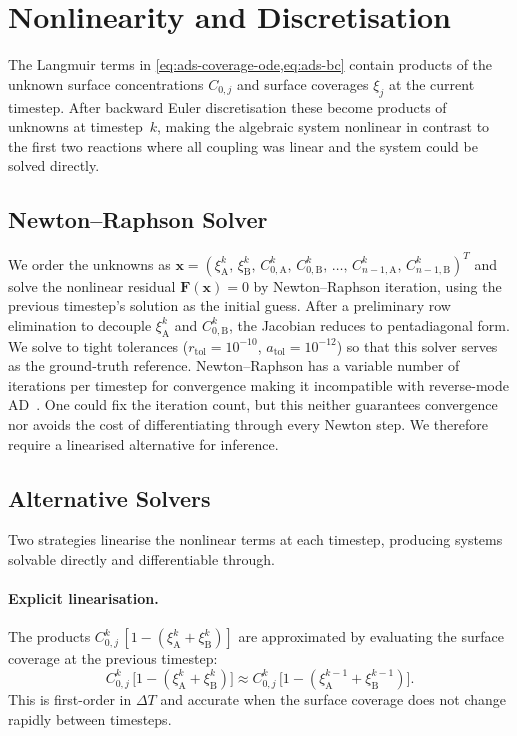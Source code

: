 \section{Nonlinearity and Discretisation}\label{sec:ads-disc}

The Langmuir terms in \cref{eq:ads-coverage-ode,eq:ads-bc} contain
products of the unknown surface concentrations $C_{0,j}$ and surface
coverages $\xi_j$ at the current timestep. After backward Euler
discretisation these become products of unknowns at timestep~$k$,
making the algebraic system nonlinear in contrast to
the first two reactions where all coupling was linear and the system
could be solved directly.

\subsection{Newton--Raphson Solver}\label{sec:ads-newton}

We order the unknowns as $\mathbf{x} = (\xi_\mathrm{A}^k,\,
  \xi_\mathrm{B}^k,\, C_{0,\mathrm{A}}^k,\, C_{0,\mathrm{B}}^k,\,
\ldots,\, C_{n-1,\mathrm{A}}^k,\, C_{n-1,\mathrm{B}}^k)^T$ and solve
the nonlinear residual $\mathbf{F}(\mathbf{x}) = 0$ by Newton--Raphson
iteration, using the previous timestep's solution as the initial guess.
After a preliminary row elimination to decouple $\xi_\mathrm{A}^k$
and $C_{0,\mathrm{B}}^k$, the Jacobian reduces to pentadiagonal form.
We solve to tight tolerances ($r_{\mathrm{tol}} = 10^{-10}$,
$a_{\mathrm{tol}} = 10^{-12}$) so that this solver serves as the
ground-truth reference. Newton--Raphson has a variable number of
iterations per timestep for convergence making it incompatible with reverse-mode
AD~\cite{jax2018github}. One could fix the iteration count, but this
neither guarantees convergence nor avoids the cost of differentiating
through every Newton step. We therefore require a linearised
alternative for inference.
\subsection{Alternative Solvers}\label{sec:ads-alt-solvers}

Two strategies linearise the nonlinear terms at each timestep, producing
systems solvable directly and differentiable through.

\paragraph{Explicit linearisation.}
The products $C_{0,j}^k\,[1 - (\xi_\mathrm{A}^k +
\xi_\mathrm{B}^k)]$ are approximated by evaluating the surface
coverage at the previous timestep:
\begin{equation}\label{eq:ads-explicit}
  C_{0,j}^k\,\bigl[1 - (\xi_\mathrm{A}^k + \xi_\mathrm{B}^k)\bigr]
  \approx
  C_{0,j}^k\,\bigl[1 - (\xi_\mathrm{A}^{k-1} + \xi_\mathrm{B}^{k-1})\bigr].
\end{equation}
This is first-order in $\Delta T$ and accurate when the surface
coverage does not change rapidly between timesteps.

